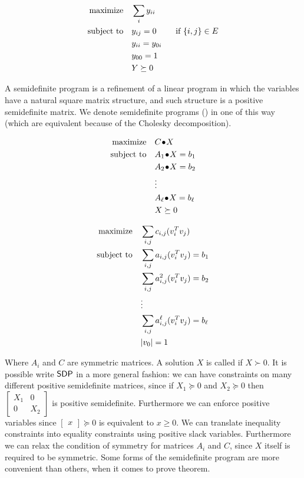 \documentclass[a4paper,twoside,justified]{tufte-handout}
\begin{document}
\begin{alignat*}{2}
  \text{maximize}\hspace{1em}& \sum_{i}y_{ii}\\
  \text{subject to}\hspace{1em}& y_{ij} =0 \qquad \text{\ if $\{i,j\}\in E$}\\
  & y_{ii} = y_{0i} \\
  & y_{00} = 1\\
  & Y \succeq 0
\end{alignat*}

A semidefinite program is a refinement of a linear program in which
the variables have a natural square matrix structure, and such
structure is a positive semidefinite matrix. We denote semidefinite
programs (\sdp) in one of this way (which are equivalent because of
the Cholesky decomposition).

\begin{figure}
\begin{minipage}[t]{0.5\textwidth}
\begin{alignat*}{2}
  \maximize \pointwiseprod{C}{X}\\
  \subjectto \pointwiseprod{A_{1}}{X} = b_{1}\\
  & \pointwiseprod{A_{2}}{X} = b_{2}\\
  & \vdots \\
  & \pointwiseprod{A_{\ell}}{X} = b_{\ell}\\
  & X \succeq 0
\end{alignat*}
\end{minipage}
\begin{minipage}[t]{0.5\textwidth}
\begin{alignat*}{2}
  \text{maximize}\hspace{1em}& \sum_{i,j}c_{i,j} (v_{i}^{T}v_{j}) \\
  \text{subject to}\hspace{1em}& \sum_{i,j} a_{i,j} (v^{T}_{i}v_{j})= b_{1}\\
  & \sum_{i,j} a^{2}_{i,j} (v^{T}_{i}v_{j})= b_{2}\\
  & \vdots \\
  & \sum_{i,j} a^{\ell}_{i,j} (v^{T}_{i}v_{j})= b_{\ell}\\
  & |v_{0}| = 1
\end{alignat*}
\end{minipage}
\end{figure}
%
Where $ A_i $ and $ C $ are symmetric matrices.  
%
A solution $X$ is called  if $ X
\succ 0 $.
%
It is possible write
$\mathsf{SDP}$ in a more general fashion: we can have constraints on many
different positive semidefinite matrices, since if $ X_{1}\succeq 0 $
and $ X_{2} \succeq 0$ then $ \begin{bmatrix}
  X_{1} & 0 \\
  0 & X_{2}
\end{bmatrix} $ is positive semidefinite. Furthermore we can enforce
positive variables since $ \begin{bmatrix}
  x
\end{bmatrix} \succeq 0$ is equivalent to $ x \geq 0$. We can
translate inequality constraints into equality constraints using
positive slack variables. Furthermore we can relax the condition of
symmetry for matrices $ A_{i} $ and $ C $, since $ X $ itself is
required to be symmetric. Some forms of the semidefinite program are
more convenient than others, when it comes to prove theorem.
\end{document}
